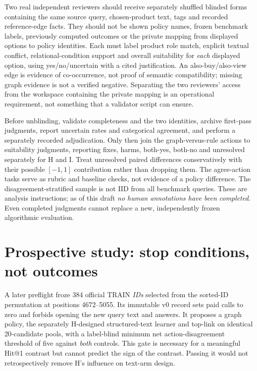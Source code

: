 Two real independent reviewers should receive separately shuffled
blinded forms containing the same source query, chosen-product text,
tags and recorded reference-edge facts. They should not be shown
policy names, frozen benchmark labels, previously computed outcomes
or the private mapping from displayed options to policy identities.
Each must label product role match, explicit textual conflict,
relational-condition support and overall suitability for \emph{each}
displayed option, using yes/no/uncertain with a cited justification.
An also-buy/also-view edge is evidence of co-occurrence, not proof
of semantic compatibility; missing graph evidence is not a verified
negative. Separating the two reviewers' access from the workspace
containing the private mapping is an operational requirement, not
something that a validator script can ensure.

Before unblinding, validate completeness and the two identities, archive
first-pass judgments, report uncertain rates and categorical agreement,
and perform a separately recorded adjudication. Only then join the
graph-versus-rule actions to suitability judgments, reporting fixes,
harms, both-yes, both-no and unresolved separately for H and I. Treat
unresolved paired differences conservatively with their possible
$[-1,1]$ contribution rather than dropping them. The agree-action
tasks serve as rubric and baseline checks, not evidence of a policy
difference. The disagreement-stratified sample is not IID from
all benchmark queries. These are analysis instructions; as of this
draft \emph{no human annotations have been completed}. Even completed
judgments cannot replace a new, independently frozen algorithmic
evaluation.

\section{Prospective study: stop conditions, not outcomes}\label{app:future}
A later preflight froze 384 official TRAIN \emph{IDs} selected from the
sorted-ID permutation at positions 4672--5055. Its immutable v0 record
sets paid calls to zero and forbids opening the new query text and
answers. It proposes a graph policy, the separately H-designed
structured-text learner and top-link on identical 20-candidate pools,
with a label-blind minimum net action-disagreement threshold of five
against \emph{both} controls. This gate is necessary for a meaningful
Hit@1 contrast but cannot predict the sign of the contrast. Passing
it would not retrospectively remove H's influence on text-arm design.

